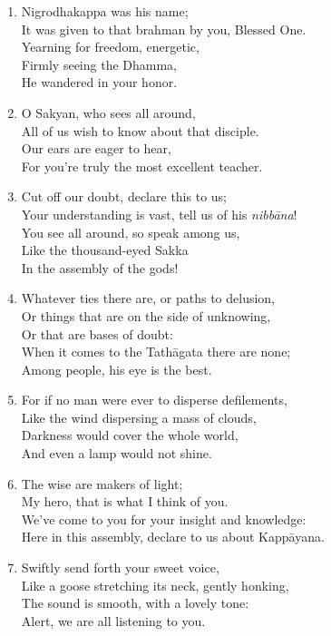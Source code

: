 \documentclass[10pt, openany]{book}
\begin{document}
\begin{enumerate}
\item Nigrodhakappa was his name;\\
It was given to that brahman by you, Blessed One.\\
Yearning for freedom, energetic, \\
Firmly seeing the Dhamma,\\
He wandered in your honor.

\item O Sakyan, who sees all around,\\
All of us wish to know about that disciple.\\
Our ears are eager to hear,\\
For you’re truly the most excellent teacher.

\item Cut off our doubt, declare this to us;\\
Your understanding is vast, tell us of his \emph{nibbāna}!\\
You see all around, so speak among us,\\
Like the thousand-eyed Sakka \\
In the assembly of the gods!

\item Whatever ties there are, or paths to delusion,\\
Or things that are on the side of unknowing,\\
Or that are bases of doubt:\\
When it comes to the Tathāgata there are none;\\
Among people, his eye is the best.

\item For if no man were ever to disperse defilements,\\
Like the wind dispersing a mass of clouds,\\
Darkness would cover the whole world,\\
And even a lamp would not shine.

\item The wise are makers of light;\\
My hero, that is what I think of you.\\
We’ve come to you for your insight and knowledge:\\
Here in this assembly, declare to us about Kappāyana.

\item Swiftly send forth your sweet voice,\\
Like a goose stretching its neck, gently honking,\\
The sound is smooth, with a lovely tone:\\
Alert, we are all listening to you.


\end{enumerate}
\end{document}
